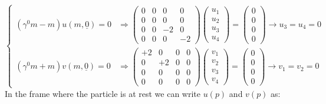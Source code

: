 \documentclass[../main.tex]{subfiles}
\begin{document}
\[
\left\{
\begin{aligned}
(\gamma^0m-m)u(m,\underline{0})=0&\Rightarrow\left(\begin{array}{cccc}
    0 & 0 & 0 & 0 \\
    0 & 0 & 0 & 0 \\
    0 & 0 & -2 & 0 \\
    0 & 0 & 0 & -2
\end{array}\right)\left(\begin{array}{c}
    u_1 \\
    u_2 \\
    u_3 \\
    u_4
\end{array}\right)=\left(\begin{array}{c}
    0 \\
    0 \\
    0 \\
    0
\end{array}\right)\xrightarrow[]{}u_3=u_4=0\\
(\gamma^0m+m)v(m,\underline{0})=0&\Rightarrow\left(\begin{array}{cccc}
    +2 & 0 & 0 & 0 \\
    0 & +2 & 0 & 0 \\
    0 & 0 & 0 & 0 \\
    0 & 0 & 0 & 0
\end{array}\right)\left(\begin{array}{c}
    v_1 \\
    v_2 \\
    v_3 \\
    v_4
\end{array}\right)=\left(\begin{array}{c}
    0 \\
    0 \\
    0 \\
    0
\end{array}\right)\xrightarrow[]{}v_1=v_2=0
\end{aligned}
\right.
\]
In the frame where the particle is at rest we can write $u(p)$ and $v(p)$ as:
\end{document}
